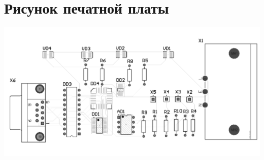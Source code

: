 \chapter{Рисунок печатной платы}
	\begin{center}
		\includegraphics[width=170mm]{src/pictures/picturep1.png}
	\end{center}
